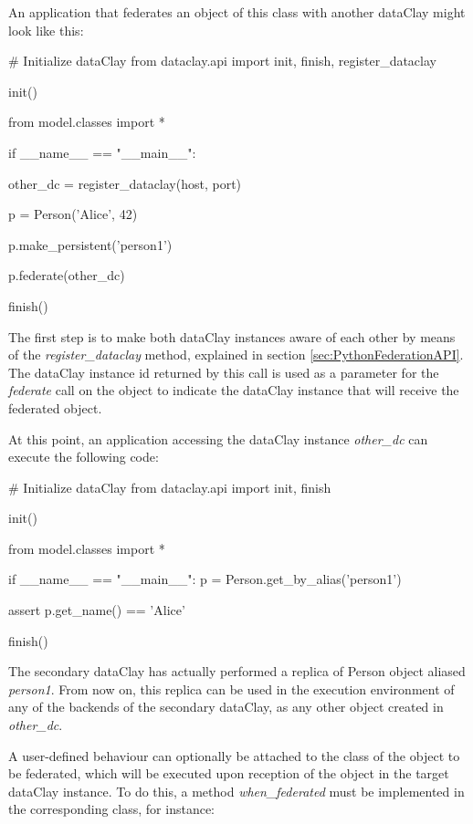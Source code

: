 An application that federates an object of this class with another dataClay might look like this:

\begin{tBox}
\begin{python}
# Initialize dataClay
from dataclay.api import init, finish, register_dataclay

init()

from model.classes import *

if __name__ == "__main__":
   
    other_dc = register_dataclay(host, port)
    
    p = Person('Alice', 42)

    p.make_persistent('person1')

    p.federate(other_dc)
    
    finish()
\end{python}
\end{tBox}

The first step is to make both dataClay instances aware of each other by means of the \textit{register\_dataclay} method, explained in section \ref{sec:PythonFederationAPI}. The dataClay instance id returned by this call is used as a parameter for the \textit{federate} call on the object to indicate the dataClay instance that will receive the federated object. 

At this point, an application accessing the dataClay instance \textit{other\_dc} can execute the following code:

\begin{tBox}
\begin{python}
# Initialize dataClay
from dataclay.api import init, finish

init()

from model.classes import *

if __name__ == "__main__":
    p = Person.get_by_alias('person1')
    
    assert p.get\_name() == 'Alice'
    
    finish()
\end{python}
\end{tBox}

The secondary dataClay has actually performed a replica of Person object aliased \textit{person1}. From now on, this 
replica can be used in the execution environment of any of the backends of the secondary dataClay, as any other object created in \textit{other\_dc}.

A user-defined behaviour can optionally be attached to the class of the object to be federated, which will be executed upon reception of the object in the target dataClay instance. To do this, a method \textit{when\_federated} must be implemented in the corresponding class, for instance:

